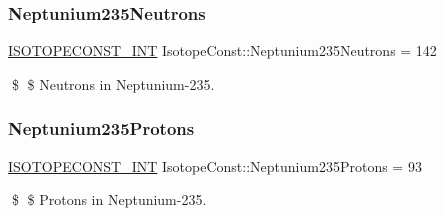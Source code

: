 \subsubsection{\texorpdfstring{Neptunium235\+Neutrons}{Neptunium235Neutrons}}
{\footnotesize\ttfamily \mbox{\hyperlink{group___isotope_const-_macros_ga5f18360b3e99483a35c32d789e62621c}{I\+S\+O\+T\+O\+P\+E\+C\+O\+N\+S\+T\+\_\+\+I\+NT}} Isotope\+Const\+::\+Neptunium235\+Neutrons = 142}

\$ \$ Neutrons in Neptunium-\/235. \mbox{\label{group___isotope_const-_neptunium-_np235_ga2561dbbbfaec92d3dbf7001f68a494b9}} 
\subsubsection{\texorpdfstring{Neptunium235\+Protons}{Neptunium235Protons}}
{\footnotesize\ttfamily \mbox{\hyperlink{group___isotope_const-_macros_ga5f18360b3e99483a35c32d789e62621c}{I\+S\+O\+T\+O\+P\+E\+C\+O\+N\+S\+T\+\_\+\+I\+NT}} Isotope\+Const\+::\+Neptunium235\+Protons = 93}

\$ \$ Protons in Neptunium-\/235. 